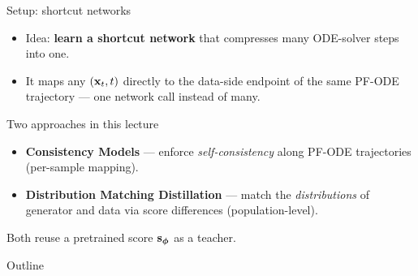 \documentclass{beamer}
\renewcommand{\eqpause}{}
\begin{document}
\begin{frame}{Setup: shortcut networks}
	\begin{itemize}
		\item Idea: \textbf{learn a shortcut network} that compresses many ODE-solver steps into one.
		\item It maps any $(\mathbf{x}_t, t)$ directly to the data-side endpoint of the same PF-ODE trajectory --- one network call instead of many.
	\end{itemize}
	\eqpause
	\begin{block}{Two approaches in this lecture}
		\begin{itemize}
			\item \textbf{Consistency Models} --- enforce \emph{self-consistency} along PF-ODE trajectories (per-sample mapping).
			\item \textbf{Distribution Matching Distillation} --- match the \emph{distributions} of generator and data via score differences (population-level).
		\end{itemize}
	\end{block}
	\eqpause
	Both reuse a pretrained score $\mathbf{s}_{\boldsymbol{\phi}}$ as a teacher.
\end{frame}
\begin{frame}{Outline}
	\tableofcontents[part=14]
\end{frame}
\end{document}

